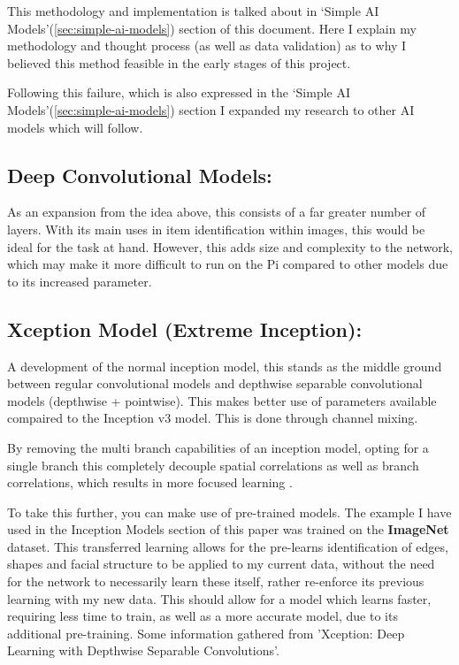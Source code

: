 This methodology and implementation is talked about in ‘Simple AI Models’(\ref{sec:simple-ai-models}) section of this document. Here I explain my
methodology and thought process (as well as data validation) as to why I believed this method feasible in the early stages of
this project.

Following this failure, which is also expressed in the ‘Simple AI Models’(\ref{sec:simple-ai-models}) section I expanded my research to other AI models
which will follow.

\subsection{Deep Convolutional Models:}
As an expansion from the idea above, this consists of a far greater number of layers. With its main uses in item identification within images,
this would be ideal for the task at hand. However, this adds size and complexity to the
network, which may make it more difficult to run on the Pi compared to other models due to its increased parameter.

\subsection{Xception Model (Extreme Inception):}
A development of the normal inception model, this stands as the middle ground between regular convolutional models and depthwise
separable convolutional models (depthwise + pointwise). This makes better use of parameters available compaired to the Inception v3 model.
This is done through channel mixing.

By removing the multi branch capabilities of an inception model, opting for a single branch this completely decouple spatial
correlations as well as branch correlations, which results in more focused learning .

To take this further, you can make use of pre-trained models. The example I have used in the Inception Models section of this
paper was trained on the \textbf{ImageNet} dataset. This transferred learning allows for the pre-learns identification of edges, shapes and facial
structure to be applied to my current data, without the need for the network to necessarily learn these itself, rather re-enforce its
previous learning with my new data. This should allow for a model which learns faster, requiring less time to train, as well as a more
accurate model, due to its additional pre-training.
Some information gathered from 'Xception: Deep Learning with Depthwise Separable Convolutions'\cite{xception}.

